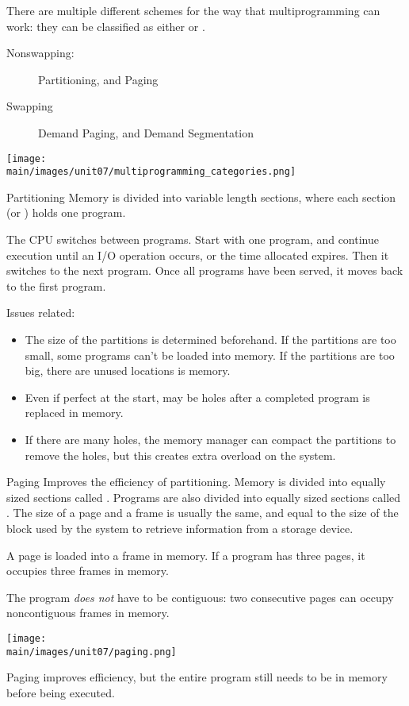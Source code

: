 \documentclass[\main/notes.tex]{subfiles}
\begin{document}
					\pagebreak
					There are multiple different schemes for the way that multiprogramming can work: they can be classified as either  or .
					\begin{indentparagraph}
						\begin{description}
							\item[Nonswapping:] Partitioning, and Paging
							\item[Swapping] Demand Paging, and Demand Segmentation
						\end{description}
					\end{indentparagraph}
					\begin{center}
						\texttt{[image: \\main/images/unit07/multiprogramming\_categories.png]}
					\end{center}
					\begin{definition}{Partitioning}
						Memory is divided into variable length sections, where each section (or ) holds one program.

						The CPU switches between programs. Start with one program, and continue execution until an I/O operation occurs, or the time allocated expires. Then it switches to the next program. Once all programs have been served, it moves back to the first program.

						Issues related:
						\begin{itemize}
							\item The size of the partitions is determined beforehand. If the partitions are too small, some programs can't be loaded into memory. If the partitions are too big, there are unused locations is memory.
							\item Even if perfect at the start, may be holes after a completed program is replaced in memory.
							\item If there are many holes, the memory manager can compact the partitions to remove the holes, but this creates extra overload on the system.
						\end{itemize}
					\end{definition}
					\pagebreak
					\begin{definition}{Paging}
						Improves the efficiency of partitioning. Memory is divided into equally sized sections called . Programs are also divided into equally sized sections called . The size of a page and a frame is usually the same, and equal to the size of the block used by the system to retrieve information from a storage device.

						A page is loaded into a frame in memory. If a program has three pages, it occupies three frames in memory.

						The program \emph{does not} have to be contiguous: two consecutive pages can occupy noncontiguous frames in memory.
						\begin{center}
							\texttt{[image: \\main/images/unit07/paging.png]}
						\end{center}

						Paging improves efficiency, but the entire program still needs to be in memory before being executed.
					\end{definition}
\end{document}
